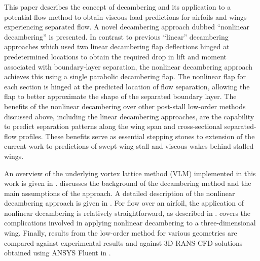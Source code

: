This paper describes the concept of decambering and its application to a potential-flow method to obtain viscous load predictions for airfoils and wings experiencing separated flow. A novel decambering approach dubbed ``nonlinear decambering'' is presented. In contrast to previous ``linear'' decambering approaches which used two linear decambering flap deflections hinged at predetermined locations to obtain the required drop in lift and moment associated with boundary-layer separation, the nonlinear decambering approach achieves this using a single parabolic decambering flap. The nonlinear flap for each section is hinged at the predicted location of flow separation, allowing the flap to better approximate the shape of the separated boundary layer.
The benefits of the nonlinear decambering over other post-stall low-order methods discussed above, including the linear decambering approaches, are the capability to predict separation patterns along the wing span and cross-sectional separated-flow profiles. These benefits serve as essential stepping stones to extension of the current work to predictions of swept-wing stall and viscous wakes behind stalled wings. 

An overview of the underlying vortex lattice method (VLM) implemented in this work is given in .  discusses the background of the decambering method and the main assumptions of the approach. A detailed description of the nonlinear decambering approach is given in . For flow over an airfoil, the application of nonlinear decambering is relatively straightforward, as described in .
 covers the complications involved in applying nonlinear decambering to a three-dimensional wing. Finally, results from the low-order method for various geometries are compared against experimental results %
and against 3D RANS CFD solutions obtained using ANSYS Fluent in .
